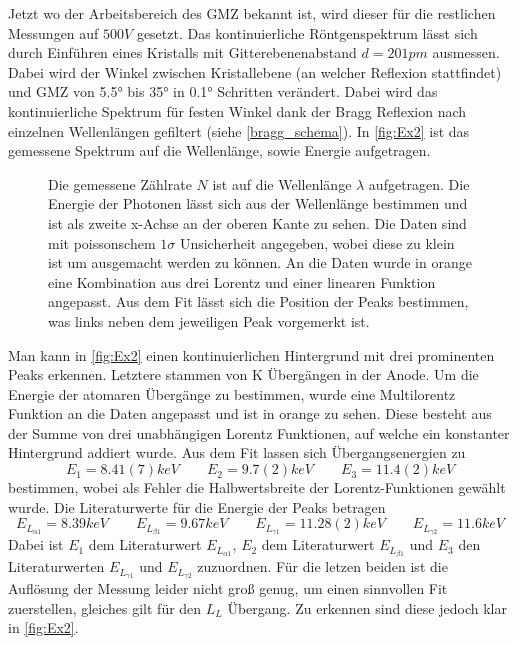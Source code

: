Jetzt wo der Arbeitsbereich des GMZ bekannt ist, wird dieser für die restlichen Messungen auf \( 500 \unit{V} \) gesetzt. Das kontinuierliche Röntgenspektrum lässt sich durch Einführen eines  Kristalls mit Gitterebenenabstand \( d = 201 \unit{pm} \) ausmessen. Dabei wird der Winkel zwischen Kristallebene (an welcher Reflexion stattfindet) und GMZ von \ang{5.5} bis \ang{35} in \ang{0.1} Schritten verändert. Dabei wird das kontinuierliche Spektrum für festen Winkel dank der Bragg Reflexion nach einzelnen Wellenlängen gefiltert (siehe \autoref{bragg_schema}). In \autoref{fig:Ex2} ist das gemessene Spektrum auf die Wellenlänge, sowie Energie aufgetragen.

\begin{figure}[H]
	\centering
	\caption{Die gemessene Zählrate \( N \) ist auf die Wellenlänge \( \lambda \) aufgetragen. Die Energie der Photonen lässt sich aus der Wellenlänge bestimmen und ist als zweite x-Achse an der oberen Kante zu sehen. Die Daten sind mit poissonschem \( 1\sigma \) Unsicherheit angegeben, wobei diese zu klein ist um ausgemacht werden zu können. An die Daten wurde in orange eine Kombination aus drei Lorentz und einer linearen Funktion angepasst. Aus dem Fit lässt sich die Position der Peaks bestimmen, was links neben dem jeweiligen Peak vorgemerkt ist.}
	\label{fig:Ex2}
\end{figure}

Man kann in \autoref{fig:Ex2} einen kontinuierlichen Hintergrund mit drei prominenten Peaks erkennen. Letztere stammen von K Übergängen in der Anode. %
Um die Energie der atomaren Übergänge zu bestimmen, wurde eine Multilorentz Funktion an die Daten angepasst und ist in orange zu sehen. Diese besteht aus der Summe von drei unabhängigen Lorentz Funktionen, auf welche ein konstanter Hintergrund addiert wurde. Aus dem Fit lassen sich Übergangsenergien zu
\begin{equation*}
	E_1 = 8.41(7) \unit{keV} \qquad E_2 = 9.7(2) \unit{keV} \qquad E_3 = 11.4(2) \unit{keV}
\end{equation*}
bestimmen, wobei als Fehler die Halbwertsbreite der Lorentz-Funktionen gewählt wurde. Die Literaturwerte für die Energie der Peaks betragen \autocite{SpektrumWolfram}
\begin{equation*}
	E_{L_{\alpha 1}} = 8.39 \unit{keV} \qquad E_{L_{\beta 1}} = 9.67 \unit{keV} \qquad E_{L_{\gamma 1}} = 11.28(2) \unit{keV} \qquad E_{L_{\gamma 2}} = 11.6 \unit{keV} 
\end{equation*}
Dabei ist $E_1$ dem Literaturwert $E_{L_{\alpha 1}}$,  $E_2$ dem Literaturwert $ E_{L_{\beta 1}}$ und $E_3$ den Literaturwerten $E_{L_{\gamma 1}}$ und $E_{L_{\gamma 2}}$ zuzuordnen. Für die letzen beiden ist die Auflösung der Messung leider nicht groß genug, um einen sinnvollen Fit zuerstellen, gleiches gilt für den $L_L$ Übergang. Zu erkennen sind diese jedoch klar in \autoref{fig:Ex2}.

